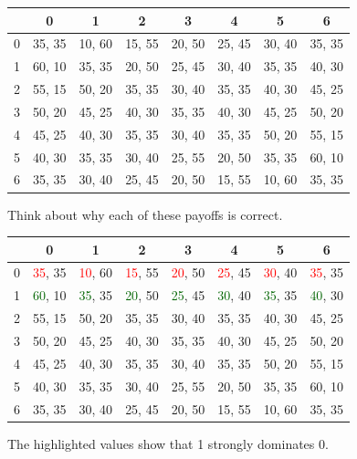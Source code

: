 \documentclass[
  14pt,
  letterpaper,
  ignorenonframetext,
  aspectratio=169,
  handout]{beamer}
\begin{document}
\begin{frame}[plain]{}
\protect\hypertarget{section}{}
\begin{table}[!h]
\centering
\begin{tabular}[t]{>{}r|ccccccc}
\toprule
 & 0 & 1 & 2 & 3 & 4 & 5 & 6\\
\midrule
0 & 35, 35 & 10, 60 & 15, 55 & 20, 50 & 25, 45 & 30, 40 & 35, 35\\
1 & 60, 10 & 35, 35 & 20, 50 & 25, 45 & 30, 40 & 35, 35 & 40, 30\\
2 & 55, 15 & 50, 20 & 35, 35 & 30, 40 & 35, 35 & 40, 30 & 45, 25\\
3 & 50, 20 & 45, 25 & 40, 30 & 35, 35 & 40, 30 & 45, 25 & 50, 20\\
4 & 45, 25 & 40, 30 & 35, 35 & 30, 40 & 35, 35 & 50, 20 & 55, 15\\
5 & 40, 30 & 35, 35 & 30, 40 & 25, 55 & 20, 50 & 35, 35 & 60, 10\\
6 & 35, 35 & 30, 40 & 25, 45 & 20, 50 & 15, 55 & 10, 60 & 35, 35\\
\bottomrule
\end{tabular}
\end{table}

Think about why each of these payoffs is correct.
\end{frame}

\begin{frame}[plain]{}
\protect\hypertarget{section-1}{}
\begin{table}[!h]
\centering
\begin{tabular}[t]{>{}r|ccccccc}
\toprule
 & 0 & 1 & 2 & 3 & 4 & 5 & 6\\
\midrule
0 & \textcolor{red}{35}, 35 & \textcolor{red}{10}, 60 & \textcolor{red}{15}, 55 & \textcolor{red}{20}, 50 & \textcolor{red}{25}, 45 & \textcolor{red}{30}, 40 & \textcolor{red}{35}, 35\\
1 & \textcolor{darkgreen}{60}, 10 & \textcolor{darkgreen}{35}, 35 & \textcolor{darkgreen}{20}, 50 & \textcolor{darkgreen}{25}, 45 & \textcolor{darkgreen}{30}, 40 & \textcolor{darkgreen}{35}, 35 & \textcolor{darkgreen}{40}, 30\\
2 & 55, 15 & 50, 20 & 35, 35 & 30, 40 & 35, 35 & 40, 30 & 45, 25\\
3 & 50, 20 & 45, 25 & 40, 30 & 35, 35 & 40, 30 & 45, 25 & 50, 20\\
4 & 45, 25 & 40, 30 & 35, 35 & 30, 40 & 35, 35 & 50, 20 & 55, 15\\
5 & 40, 30 & 35, 35 & 30, 40 & 25, 55 & 20, 50 & 35, 35 & 60, 10\\
6 & 35, 35 & 30, 40 & 25, 45 & 20, 50 & 15, 55 & 10, 60 & 35, 35\\
\bottomrule
\end{tabular}
\end{table}

The highlighted values show that 1 strongly dominates 0.
\end{frame}
\end{document}
